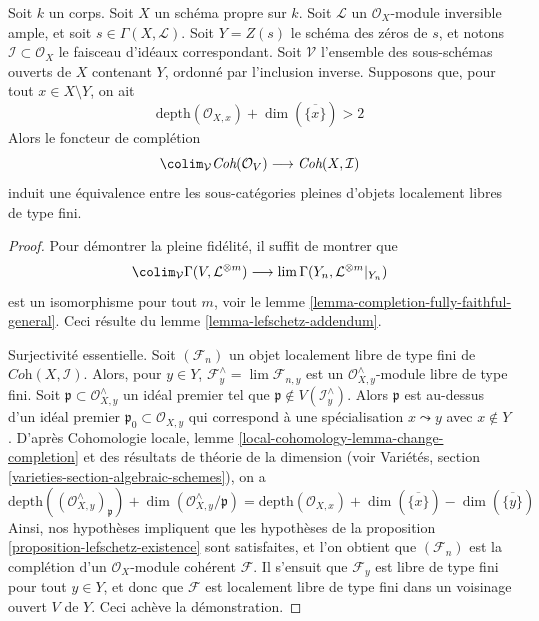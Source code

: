 \begin{proposition}
\label{proposition-lefschetz-equivalence}
Soit $k$ un corps. Soit $X$ un schéma propre sur $k$.
Soit $\mathcal{L}$ un $\mathcal{O}_X$-module inversible ample,
et soit $s \in \Gamma(X, \mathcal{L})$. Soit $Y = Z(s)$
le schéma des zéros de $s$, et notons $\mathcal{I} \subset \mathcal{O}_X$
le faisceau d'idéaux correspondant.
Soit $\mathcal{V}$ l'ensemble des sous-schémas ouverts de $X$ contenant $Y$,
ordonné par l'inclusion inverse.
Supposons que, pour tout $x \in X \setminus Y$, on ait
$$
\text{depth}(\mathcal{O}_{X, x}) + \dim(\overline{\{x\}}) > 2
$$
Alors le foncteur de complétion
$$
\colim_\mathcal{V}
\textit{Coh}(\mathcal{O}_V)
\longrightarrow
\textit{Coh}(X, \mathcal{I})
$$
induit une équivalence entre les sous-catégories pleines d'objets localement libres de type fini.
\end{proposition}

\begin{proof}
Pour démontrer la pleine fidélité, il suffit de montrer que
$$
\colim_\mathcal{V} \Gamma(V, \mathcal{L}^{\otimes m})
\longrightarrow
\lim \Gamma(Y_n, \mathcal{L}^{\otimes m}|_{Y_n})
$$
est un isomorphisme pour tout $m$, voir le
lemme \ref{lemma-completion-fully-faithful-general}.
Ceci résulte du lemme \ref{lemma-lefschetz-addendum}.

\medskip\noindent
Surjectivité essentielle. Soit $(\mathcal{F}_n)$ un objet localement
libre de type fini de $\textit{Coh}(X, \mathcal{I})$. Alors, pour $y \in Y$,
$\mathcal{F}_y^\wedge = \lim \mathcal{F}_{n, y}$
est un $\mathcal{O}_{X, y}^\wedge$-module libre de type fini.
Soit $\mathfrak p \subset \mathcal{O}_{X, y}^\wedge$
un idéal premier tel que $\mathfrak p \not \in V(\mathcal{I}_y^\wedge)$.
Alors $\mathfrak p$ est au-dessus d'un idéal premier $\mathfrak p_0 \subset \mathcal{O}_{X, y}$
qui correspond à une spécialisation $x \leadsto y$ avec
$x \not \in Y$. D'après Cohomologie locale, lemme
\ref{local-cohomology-lemma-change-completion}
et des résultats de théorie de la dimension
(voir Variétés, section \ref{varieties-section-algebraic-schemes}),
on a
$$
\text{depth}((\mathcal{O}_{X, y}^\wedge)_\mathfrak p) +
\dim(\mathcal{O}_{X, y}^\wedge/\mathfrak p) =
\text{depth}(\mathcal{O}_{X, x}) +
\dim(\overline{\{x\}}) - \dim(\overline{\{y\}})
$$
Ainsi, nos hypothèses impliquent que les hypothèses de la
proposition \ref{proposition-lefschetz-existence}
sont satisfaites, et l'on obtient que $(\mathcal{F}_n)$
est la complétion d'un $\mathcal{O}_X$-module cohérent $\mathcal{F}$.
Il s'ensuit que $\mathcal{F}_y$ est libre de type fini pour tout $y \in Y$,
et donc que $\mathcal{F}$ est localement libre de type fini dans un
voisinage ouvert $V$ de $Y$. Ceci achève la démonstration.
\end{proof}















